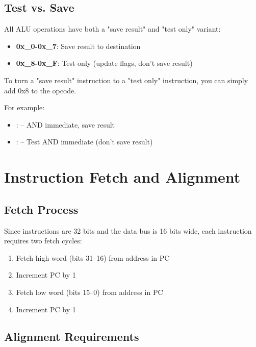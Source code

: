 \subsection{Test vs. Save}

All ALU operations have both a "save result" and "test only" variant:

\begin{itemize}
	\item \textbf{0x\_0-0x\_7}: Save result to destination
	\item \textbf{0x\_8-0x\_F}: Test only (update flags, don't save result)
\end{itemize}

To turn a "save result" instruction to a "test only" instruction, you can simply add 0x8 to the opcode.

For example:

\begin{itemize}
	\item {}:  -- AND immediate, save result
	\item {}:  -- Test AND immediate (don't save result)
\end{itemize}

\section{Instruction Fetch and Alignment}

\subsection{Fetch Process}

Since instructions are 32 bits and the data bus is 16 bits wide, each instruction requires two fetch cycles:

\begin{enumerate}
	\item Fetch high word (bits 31--16) from address in PC
	\item Increment PC by 1
	\item Fetch low word (bits 15--0) from address in PC
	\item Increment PC by 1
\end{enumerate}

\subsection{Alignment Requirements}


